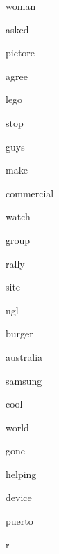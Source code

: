 \documentclass[varwidth]{standalone}
\begin{document}
\begin{CJK*}{UTF8}{gbsn}
{{{\colorbox{red!6.455954551696777}{\strut woman}
\colorbox{red!0}{\strut asked}
\colorbox{red!14.88978385925293}{\strut pictore}
\colorbox{red!12.417747497558594}{\strut agree}
\colorbox{red!13.820101737976074}{\strut lego}
\colorbox{red!5.5590105056762695}{\strut stop}
\colorbox{red!4.62848424911499}{\strut guys}
\colorbox{red!15.212181091308594}{\strut make}
\colorbox{red!8.772234916687012}{\strut commercial}
\colorbox{red!6.408526420593262}{\strut watch}
\colorbox{red!7.497848987579346}{\strut group}
\colorbox{red!4.750458717346191}{\strut rally}
\colorbox{red!4.19964075088501}{\strut site}
\colorbox{red!16.588214874267578}{\strut ngl}
\colorbox{red!13.104151725769043}{\strut burger}
\colorbox{red!14.175260543823242}{\strut australia}
\colorbox{red!14.25837230682373}{\strut samsung}
\colorbox{red!2.390458345413208}{\strut cool}
\colorbox{red!7.53277587890625}{\strut world}
\colorbox{red!4.669232368469238}{\strut gone}
\colorbox{red!8.551054000854492}{\strut helping}
\colorbox{red!2.63407564163208}{\strut device}
\colorbox{red!15.612459182739258}{\strut puerto}
\colorbox{red!15.728106498718262}{\strut r}

}}}
\end{CJK*}
\end{document}

